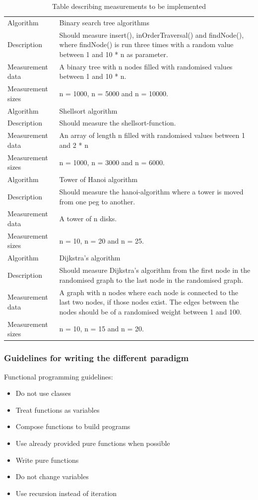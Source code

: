 \documentclass {article}
\begin{document}
\begin{table}[H]
\begin{tabular}{ | l p{10cm} | }
\hline
Algorithm & Binary search tree algorithms \\
Description & Should measure insert(), inOrderTraversal() and findNode(), where findNode() is run three times with a random value between 1 and 10 * n as parameter. \\
Measurement data & A binary tree with n nodes filled with randomised values between 1 and 10 * n. \\ 
Measurement sizes & n = 1000, n = 5000 and n = 10000. \\
\hline
Algorithm & Shellsort algorithm \\
Description & Should measure the shellsort-function.\\
Measurement data & An array of length n filled with randomised values between 1 and 2 * n \\ 
Measurement sizes & n = 1000, n = 3000 and n = 6000. \\
\hline
Algorithm & Tower of Hanoi algorithm \\
Description & Should measure the hanoi-algorithm where a tower is moved from one peg to another. \\
Measurement data & A tower of n disks. \\ 
Measurement sizes & n = 10, n = 20 and n = 25. \\
\hline
Algorithm & Dijkstra's algorithm \\
Description & Should measure Dijkstra's algorithm from the first node in the randomised graph to the last node in the randomised graph.\\
Measurement data & A graph with n nodes where each node is connected to the last two nodes, if those nodes exist. The edges between the nodes should be of a randomised weight between 1 and 100.\\ 
Measurement sizes & n = 10, n = 15 and n = 20. \\
\hline
\end{tabular}
\caption{Table describing measurements to be implemented}
\label{tab:measurements}
\end{table}
\subsubsection{Guidelines for writing the different paradigm}
\label{sec:paradigm-guidelines}
Functional programming guidelines:
\begin{itemize}
\item Do not use classes
\item Treat functions as variables
\item Compose functions to build programs
\item Use already provided pure functions when possible
\item Write pure functions
\item Do not change variables
\item Use recursion instead of iteration
\end{itemize}
\end{document}
